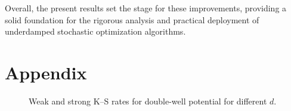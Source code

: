 \documentclass[12pt]{article}
\begin{document}
Overall, the present results set the stage for these improvements, providing a solid foundation for the rigorous analysis and practical deployment of underdamped stochastic optimization algorithms.

\newpage
\printbibliography


\newpage
\section{Appendix}

\begin{figure}[!htbp]
    \centering
    \begin{minipage}{0.48\textwidth}
        \centering
    \end{minipage}\hfill
    \begin{minipage}{0.48\textwidth}
        \centering
    \end{minipage}

    \vspace{0.5em}

    \begin{minipage}{0.48\textwidth}
        \centering
    \end{minipage}\hfill
    \begin{minipage}{0.48\textwidth}
        \centering
    \end{minipage}

    \caption{Weak and strong K--S rates for double-well potential for different $d$.}
    \label{fig: double well d4,16,64,256 n_rep100}
\end{figure}
\end{document}

